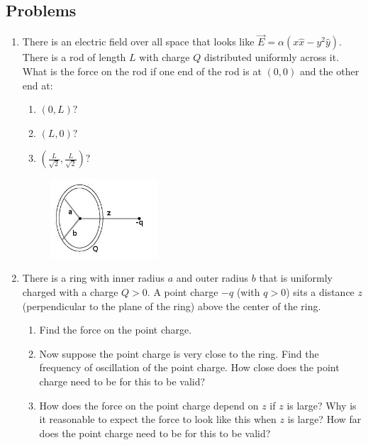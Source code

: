 \documentclass[12pt]{book}
\begin{document}
\subsection{Problems}

\begin{enumerate}
 \item There is an electric field over all space that looks like $\vec{E} = \alpha(x \hat{x} - y^2 \hat{y}).$ There is a rod of length $L$ with charge $Q$ distributed uniformly across it. What is the force on the rod if one end of the rod is at $(0,0)$ and the other end at:
 \begin{enumerate}
  \item $(0,L)?$
  \item $(L,0)?$
  \item $(\frac{L}{\sqrt{2}},\frac{L}{\sqrt{2}})?$
 \end{enumerate}
 
 \pagebreak
 
 
\begin{center}
\begin{figure}[h]
\centering
\includegraphics[width=150px]{Prelab2Pic.jpeg}
\end{figure}
\end{center}

 \item There is a ring with inner radius $a$ and outer radius $b$ that is uniformly charged with a charge $Q>0.$ A point charge $-q$ (with $q>0$) sits a distance $z$ (perpendicular to the plane of the ring) above the center of the ring.
 
 \begin{enumerate}
 \item Find the force on the point charge.
 \item Now suppose the point charge is very close to the ring. Find the frequency of oscillation of the point charge. How close does the point charge need to be for this to be valid?
 \item How does the force on the point charge depend on $z$ if $z$ is large? Why is it reasonable to expect the force to look like this when $z$ is large? How far does the point charge need to be for this to be valid?
 \end{enumerate}
 

\end{enumerate}
\end{document}
